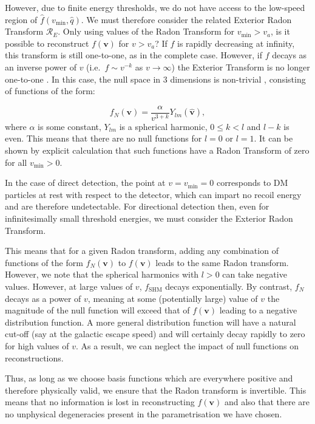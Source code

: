 However, due to finite energy thresholds, we do not have access to the low-speed region of $\hat{f}(v_\textrm{min}, \hat{q})$. We must therefore consider the related Exterior Radon Transform \(\mathcal{R}_E\). Only using values of the Radon Transform for \(v_{\textrm{min}} > v_a\), is it possible to reconstruct $f(\textbf{v})$ for $v > v_a$? If \(f\) is rapidly decreasing at infinity, this transform is still one-to-one, as in the complete case. However, if \(f\) decays as an inverse power of \(v\) (i.e.\ \(f \sim v^{-k}\) as \(v\rightarrow \infty\)) the Exterior Transform is no longer one-to-one \cite{Shepp:1978}.  In this case, the null space in 3 dimensions is non-trivial \cite{Quinto:1982}, consisting of functions of the form:

\begin{equation}
\label{eq:null}
f_N(\textbf{v}) = \frac{\alpha}{v^{3+k}} Y_{lm}(\hat{\textbf{v}}),
\end{equation}
where \(\alpha\) is some constant, \(Y_{lm}\) is a spherical harmonic, \(0 \leq k < l\) and \(l-k\) is even. This means that there are no null functions for \(l = 0\) or \(l = 1\). It can be shown by explicit calculation that such functions have a Radon Transform of zero for all \(v_\textrm{min} > 0\).

In the case of direct detection, the point at \(v = v_\textrm{min} = 0\) corresponds to DM particles at rest with respect to the detector, which can impart no recoil energy and are therefore undetectable. For directional detection then, even for infinitesimally small threshold energies, we must consider the Exterior Radon Transform.

This means that for a given Radon transform, adding any combination of functions of the form $f_N(\textbf{v})$ to $f(\textbf{v})$ leads to the same Radon transform. However, we note that the spherical harmonics with \(l > 0\) can take negative values. However, at large values of \(v\), \(f_\textrm{SHM}\) decays exponentially. By contrast, \(f_N\) decays as a power of \(v\), meaning at some (potentially large) value of \(v\) the magnitude of the null function will exceed that of \(f(\textbf{v})\) leading to a negative distribution function. A more general distribution function will have a natural cut-off (say at the galactic escape speed) and will certainly decay rapidly to zero for high values of \(v\). As a result, we can neglect the impact of null functions on reconstructions.

Thus, as long as we choose basis functions which are everywhere positive and therefore physically valid, we ensure that the Radon transform is invertible. This means that no information is lost in reconstructing $f(\textbf{v})$ and also that there are no unphysical degeneracies present in the parametrisation we have chosen.

